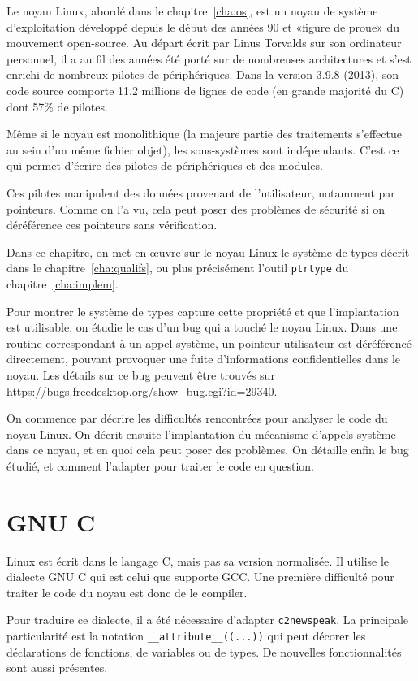 Le noyau Linux, abordé dans le chapitre~\ref{cha:os}, est un noyau de système
d'exploitation développé depuis le début des années 90 et «figure de proue» du
mouvement open-source. Au départ écrit par Linus Torvalds sur son ordinateur
personnel, il a au fil des années été porté sur de nombreuses architectures et
s'est enrichi de nombreux pilotes de périphériques. Dans la version 3.9.8
(2013), son code source comporte 11.2 millions de lignes de code (en grande
majorité du C) dont 57\% de pilotes.

Même si le noyau est monolithique (la majeure partie des traitements s'effectue
au sein d'un même fichier objet), les sous-systèmes sont indépendants. C'est ce
qui permet d'écrire des pilotes de périphériques et des modules.

Ces pilotes manipulent des données provenant de l'utilisateur, notamment par
pointeurs. Comme on l'a vu, cela peut poser des problèmes de sécurité si on
déréférence ces pointeurs sans vérification.

Dans ce chapitre, on met en œuvre sur le noyau Linux le système de types décrit
dans le chapitre~\ref{cha:qualifs}, ou plus précisément l'outil \texttt{ptrtype}
du chapitre~\ref{cha:implem}.

Pour montrer le système de types capture cette propriété et que l'implantation
est utilisable, on étudie le cas d'un bug qui a touché le noyau Linux. Dans une
routine correspondant à un appel système, un pointeur utilisateur est
déréférencé directement, pouvant provoquer une fuite d'informations
confidentielles dans le noyau. Les détails sur ce bug peuvent être trouvés sur
\url{https://bugs.freedesktop.org/show_bug.cgi?id=29340}.

On commence par décrire les difficultés rencontrées pour analyser le code du
noyau Linux. On décrit ensuite l'implantation du mécanisme d'appels système dans
ce noyau, et en quoi cela peut poser des problèmes. On détaille enfin le bug
étudié, et comment l'adapter pour traiter le code en question.

\section{GNU C}
\label{sec:gnuc}

Linux est écrit dans le langage C, mais pas sa version normalisée. Il utilise le
dialecte GNU C qui est celui que supporte GCC. Une première difficulté pour
traiter le code du noyau est donc de le compiler.

Pour traduire ce dialecte, il a été nécessaire d'adapter \texttt{c2newspeak}. La
principale particularité est la notation \verb!__attribute__((...))! qui peut
décorer les déclarations de fonctions, de variables ou de types. De nouvelles
fonctionnalités sont aussi présentes.

